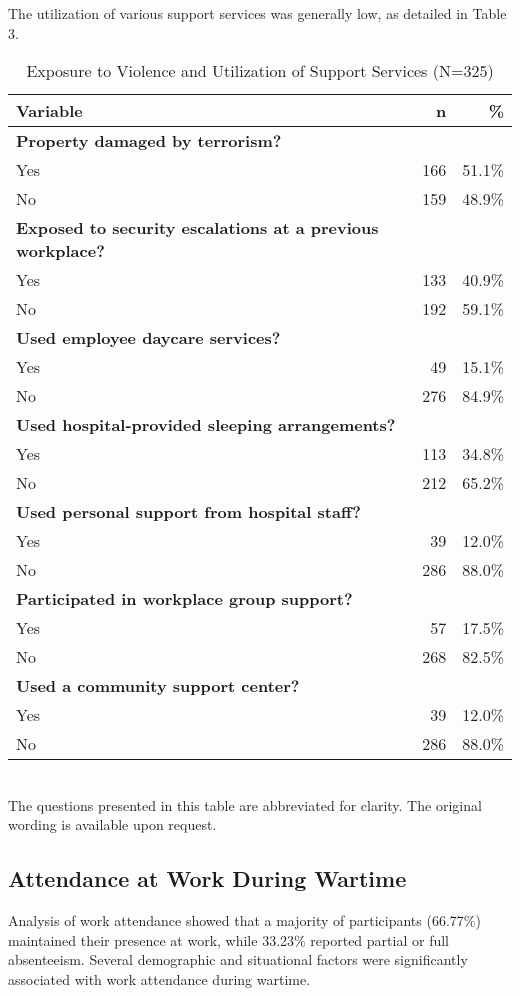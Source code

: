 \documentclass[12pt]{article}
\begin{document}
The utilization of various support services was generally low, as detailed in Table 3.

\begin{table}[h!]
\centering
\caption{Exposure to Violence and Utilization of Support Services (N=325)}
\label{tab:exposure}
\begin{tabular}{l r r}
\toprule
\textbf{Variable} & \textbf{n} & \textbf{\%} \\
\midrule
\textbf{Property damaged by terrorism?} & & \\
\quad Yes & 166 & 51.1\% \\
\quad No & 159 & 48.9\% \\
\midrule
\textbf{Exposed to security escalations at a previous workplace?} & & \\
\quad Yes & 133 & 40.9\% \\
\quad No & 192 & 59.1\% \\
\midrule
\textbf{Used employee daycare services?} & & \\
\quad Yes & 49 & 15.1\% \\
\quad No & 276 & 84.9\% \\
\midrule
\textbf{Used hospital-provided sleeping arrangements?} & & \\
\quad Yes & 113 & 34.8\% \\
\quad No & 212 & 65.2\% \\
\midrule
\textbf{Used personal support from hospital staff?} & & \\
\quad Yes & 39 & 12.0\% \\
\quad No & 286 & 88.0\% \\
\midrule
\textbf{Participated in workplace group support?} & & \\
\quad Yes & 57 & 17.5\% \\
\quad No & 268 & 82.5\% \\
\midrule
\textbf{Used a community support center?} & & \\
\quad Yes & 39 & 12.0\% \\
\quad No & 286 & 88.0\% \\
\bottomrule
\end{tabular}
\\
\smallskip
\footnotesize *The questions presented in this table are abbreviated for clarity. The original wording is available upon request.
\end{table}

\subsection{Attendance at Work During Wartime}
Analysis of work attendance showed that a majority of participants (66.77\%) maintained their presence at work, while 33.23\% reported partial or full absenteeism.
Several demographic and situational factors were significantly associated with work attendance during wartime.
\end{document}
